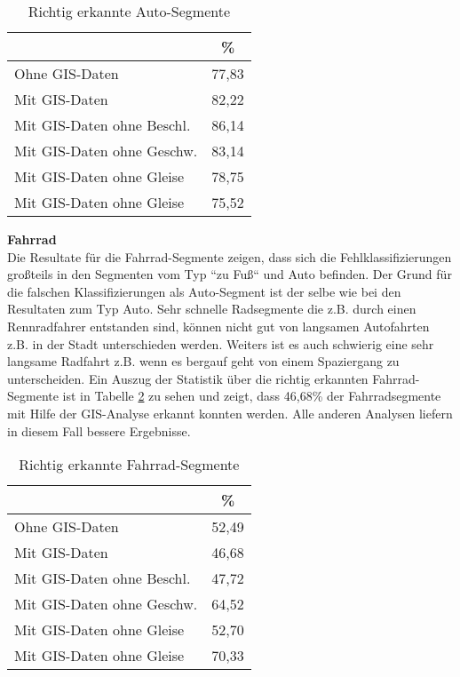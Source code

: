 \begin{table}[h]
\centering
\begin{tabular}{|l|c|}
\hline
 & \% \\ \hline
Ohne GIS-Daten & 77,83 \\ \hline
Mit GIS-Daten & 82,22 \\ \hline
Mit GIS-Daten ohne Beschl. & 86,14 \\ \hline
Mit GIS-Daten ohne Geschw. & 83,14 \\ \hline
Mit GIS-Daten ohne Gleise & 78,75 \\ \hline
Mit GIS-Daten ohne Gleise & 75,52 \\ \hline
\end{tabular}
\caption{Richtig erkannte Auto-Segmente}
\label{result-drive}
\end{table}

\textbf{Fahrrad} \\
Die Resultate für die Fahrrad-Segmente zeigen, dass sich die Fehlklassifizierungen großteils in den Segmenten vom Typ ``zu Fuß`` und Auto befinden. Der Grund für die falschen Klassifizierungen als Auto-Segment ist der selbe wie bei den Resultaten zum Typ Auto. Sehr schnelle Radsegmente die z.B. durch einen Rennradfahrer entstanden sind, können nicht gut von langsamen Autofahrten z.B. in der Stadt unterschieden werden. Weiters ist es auch schwierig eine sehr langsame Radfahrt z.B. wenn es bergauf geht von einem Spaziergang zu unterscheiden. Ein Auszug der Statistik über die richtig erkannten Fahrrad-Segmente ist in Tabelle \ref{result-bike} zu sehen und zeigt, dass 46,68\% der Fahrradsegmente mit Hilfe der GIS-Analyse erkannt konnten werden. Alle anderen Analysen liefern in diesem Fall bessere Ergebnisse.

\begin{table}[h]
\centering
\begin{tabular}{|l|c|}
\hline
 & \% \\ \hline
Ohne GIS-Daten & 52,49 \\ \hline
Mit GIS-Daten & 46,68 \\ \hline
Mit GIS-Daten ohne Beschl. & 47,72 \\ \hline
Mit GIS-Daten ohne Geschw. & 64,52 \\ \hline
Mit GIS-Daten ohne Gleise & 52,70 \\ \hline
Mit GIS-Daten ohne Gleise & 70,33 \\ \hline
\end{tabular}
\caption{Richtig erkannte Fahrrad-Segmente}
\label{result-bike}
\end{table}

